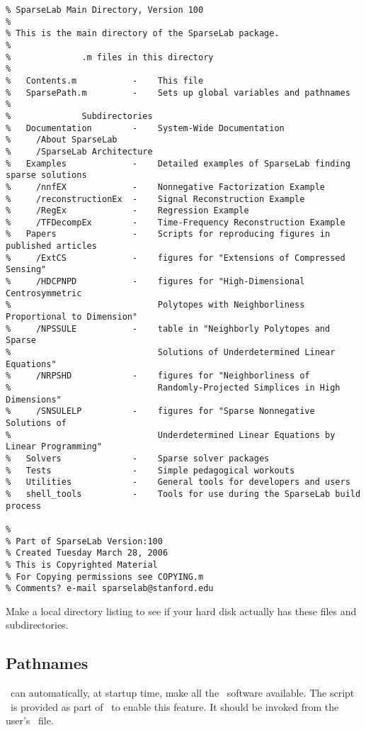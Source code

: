 \documentclass{article}
\begin{document}
\begin{verbatim}
% SparseLab Main Directory, Version 100
%
% This is the main directory of the SparseLab package.
%
%              .m files in this directory
%
%   Contents.m           -    This file
%   SparsePath.m         -    Sets up global variables and pathnames
%
%              Subdirectories
%   Documentation        -    System-Wide Documentation
%     /About SparseLab
%     /SparseLab Architecture
%   Examples             -    Detailed examples of SparseLab finding sparse solutions
%     /nnfEX             -    Nonnegative Factorization Example
%     /reconstructionEx  -    Signal Reconstruction Example
%     /RegEx             -    Regression Example
%     /TFDecompEx        -    Time-Frequency Reconstruction Example
%   Papers               -    Scripts for reproducing figures in published articles
%     /ExtCS             -    figures for "Extensions of Compressed Sensing"
%     /HDCPNPD           -    figures for "High-Dimensional Centrosymmetric
%                             Polytopes with Neighborliness Proportional to Dimension"
%     /NPSSULE           -    table in "Neighborly Polytopes and Sparse
%                             Solutions of Underdetermined Linear Equations"
%     /NRPSHD            -    figures for "Neighborliness of
%                             Randomly-Projected Simplices in High Dimensions"
%     /SNSULELP          -    figures for "Sparse Nonnegative Solutions of
%                             Underdetermined Linear Equations by Linear Programming"
%   Solvers              -    Sparse solver packages
%   Tests                -    Simple pedagogical workouts
%   Utilities            -    General tools for developers and users
%   shell_tools          -    Tools for use during the SparseLab build process

%
% Part of SparseLab Version:100
% Created Tuesday March 28, 2006
% This is Copyrighted Material
% For Copying permissions see COPYING.m
% Comments? e-mail sparselab@stanford.edu
\end{verbatim}

Make a local directory listing to see if your hard disk actually has
these files and subdirectories.

\subsection{Pathnames}

\Matlab\ can automatically, at startup time, make all the \WaveLab\ software
available. The script \WavePath\ is provided as part of \WaveLab\ to enable this
feature. It should be invoked from the user's \Startup\ file.
\end{document}
